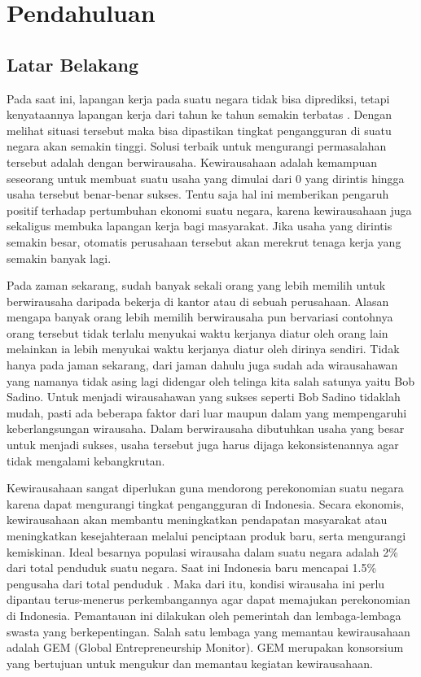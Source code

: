 \chapter{Pendahuluan}
\label{chap:intro}
   
\section{Latar Belakang}
\label{sec:label}

Pada saat ini, lapangan kerja pada suatu negara tidak bisa diprediksi, tetapi kenyataannya lapangan kerja dari tahun ke tahun semakin terbatas \cite{LBwirausaha}. Dengan melihat situasi tersebut maka bisa dipastikan tingkat pengangguran di suatu negara akan semakin tinggi. Solusi terbaik untuk mengurangi permasalahan tersebut adalah dengan berwirausaha. Kewirausahaan adalah kemampuan seseorang untuk membuat suatu usaha yang dimulai dari 0 yang dirintis hingga usaha tersebut benar-benar sukses. Tentu saja hal ini memberikan pengaruh positif terhadap pertumbuhan ekonomi suatu negara, karena kewirausahaan juga sekaligus membuka lapangan kerja bagi masyarakat. Jika usaha yang dirintis semakin besar, otomatis perusahaan tersebut akan merekrut tenaga kerja yang semakin banyak lagi. 

 
Pada zaman sekarang, sudah banyak sekali orang yang lebih memilih untuk berwirausaha daripada bekerja di kantor atau di sebuah perusahaan. Alasan mengapa banyak orang lebih memilih berwirausaha pun bervariasi contohnya orang tersebut tidak terlalu menyukai waktu kerjanya diatur oleh orang lain melainkan ia lebih menyukai waktu kerjanya diatur oleh dirinya sendiri. Tidak hanya pada jaman sekarang, dari jaman dahulu juga sudah ada wirausahawan yang namanya tidak asing lagi didengar oleh telinga kita salah satunya yaitu Bob Sadino. Untuk menjadi wirausahawan yang sukses seperti Bob Sadino tidaklah mudah, pasti ada beberapa faktor dari luar maupun dalam yang mempengaruhi keberlangsungan wirausaha. Dalam berwirausaha dibutuhkan usaha yang besar untuk menjadi sukses, usaha tersebut juga harus dijaga kekonsistenannya agar tidak mengalami kebangkrutan.


Kewirausahaan sangat diperlukan guna mendorong perekonomian suatu negara karena dapat mengurangi tingkat pengangguran di Indonesia. Secara ekonomis, kewirausahaan akan membantu meningkatkan pendapatan masyarakat atau meningkatkan kesejahteraan melalui penciptaan produk baru, serta mengurangi kemiskinan.  Ideal besarnya populasi wirausaha dalam suatu negara adalah 2\% dari total penduduk suatu negara. Saat ini Indonesia baru mencapai 1.5\% pengusaha dari total penduduk \cite{ECA}. Maka dari itu, kondisi wirausaha ini perlu dipantau terus-menerus perkembangannya agar dapat memajukan perekonomian di Indonesia. Pemantauan ini dilakukan oleh pemerintah dan lembaga-lembaga swasta yang berkepentingan. Salah satu lembaga yang memantau kewirausahaan adalah GEM (Global Entrepreneurship Monitor). GEM merupakan konsorsium yang bertujuan untuk mengukur dan memantau kegiatan kewirausahaan. 


